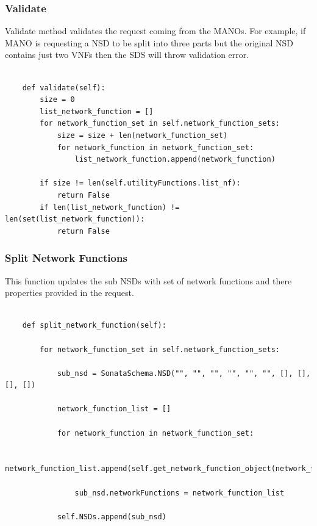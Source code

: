 \subsubsection{Validate} Validate method validates the request coming from the MANOs. For example, if MANO is requesting a NSD to be split into three parts but the original NSD contains just two VNFs then the SDS will throw validation error.

\begin{lstlisting}[caption=Splitting Request Validation, label=lis:validation]

    def validate(self):
        size = 0
        list_network_function = []
        for network_function_set in self.network_function_sets:
            size = size + len(network_function_set)
            for network_function in network_function_set:
                list_network_function.append(network_function)

        if size != len(self.utilityFunctions.list_nf):
            return False
        if len(list_network_function) != len(set(list_network_function)):
            return False

\end{lstlisting}

\subsubsection{Split Network Functions}
This function updates the sub NSDs with set of network functions and there properties provided in the request.

\begin{lstlisting}[caption=Network Function Splitting, label=lis:NFSplitting]

    def split_network_function(self):

        for network_function_set in self.network_function_sets:

            sub_nsd = SonataSchema.NSD("", "", "", "", "", "", [], [], [], [])

            network_function_list = []

            for network_function in network_function_set:

                network_function_list.append(self.get_network_function_object(network_function))

                sub_nsd.networkFunctions = network_function_list

            self.NSDs.append(sub_nsd)

\end{lstlisting}

